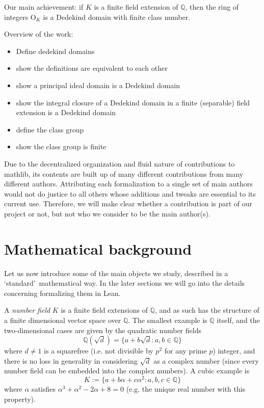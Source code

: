 \documentclass[a4paper,USenglish,cleveref, autoref, thm-restate]{lipics-v2021}
\newcommand{\OK}{\mathrm{O}_K}
\newcommand{\Q}{\mathbb{Q}}
\begin{document}
Our main achievement: if $K$ is a finite field extension of $\Q$, then the ring of integers $\OK$ is a Dedekind domain with finite class number.

Overview of the work:
\begin{itemize}
 \item Define dedekind domains
 \item show the definitions are equivalent to each other
 \item show a principal ideal domain is a Dedekind domain
 \item show the integral closure of a Dedekind domain in a finite (separable) field extension is a Dedekind domain
 \item define the class group
 \item show the class group is finite
\end{itemize}

Due to the decentralized organization and fluid nature of contributions to mathlib, its contents are built up of many different contributions from many different authors. Attributing each formalization to a single set of main authors would not do justice to all others whose additions and tweaks are essential to its current use. Therefore, we will make clear whether a contribution is part of our project or not, but not who we consider to be the main author(s).

\section{Mathematical background}\label{sec math background}

Let us now introduce some of the main objects we study, described in a \lq standard\rq\ mathematical way. In the later sections we will go into the details concerning formalizing them in Lean.

A \emph{number field} $K$ is a finite field extensions of $\Q$, and as such has the structure of a finite dimensional vector space over $\Q$. The smallest example is $\Q$ itself, and the two-dimensional cases are given by the quadratic number fields
\[\Q(\sqrt{d})=\{a+b\sqrt{d} : a,b \in \Q\}\]
where $d\not=1$ is a squarefree (i.e. not divisible by $p^2$ for any prime $p$) integer, and there is no loss in generality in considering $\sqrt{d}$ as a complex number (since every number field can be embedded into the complex numbers).
A cubic example is
\[K:=\{a+b\alpha+c \alpha^2: a,b,c \in \Q\}\]
where $\alpha$ satisfies $\alpha^3 + \alpha^2 - 2\alpha + 8=0$ (e.g. the unique real number with this property).
\end{document}
